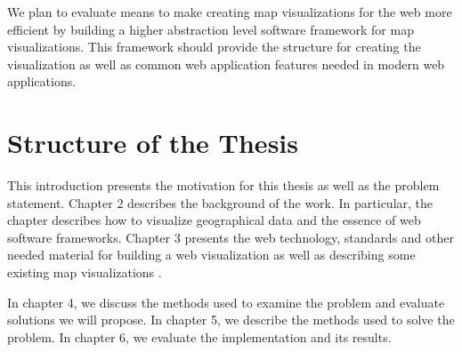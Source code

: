 We plan to evaluate means to make creating map visualizations for the web more efficient by building a higher abstraction level software framework for map visualizations. This framework should provide the structure for creating the visualization as well as common web application features needed in modern web applications.




\section{Structure of the Thesis}
\label{section:structure} 

This introduction presents the motivation for this thesis as well as the problem statement. Chapter 2 describes the background of the work. In particular, the chapter describes how to visualize geographical data and the essence of web software frameworks. Chapter 3 presents the web technology, standards and other needed material for building a web visualization as well as describing some existing map visualizations .

In chapter 4, we discuss the methods used to examine the problem and evaluate solutions we will propose. In chapter 5, we describe the methods used to solve the problem. In chapter 6, we evaluate the implementation and its results. 


